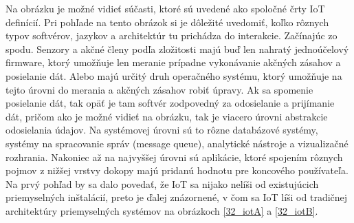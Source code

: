Na obrázku je možné vidieť súčasti, ktoré sú uvedené ako spoločné črty IoT definícií. Pri pohľade na tento obrázok si je dôležité uvedomiť, koľko rôznych typov softvérov, jazykov a architektúr tu prichádza do interakcie. Začínajúc zo spodu. Senzory a akčné členy podľa zložitosti majú buď len nahratý jednoúčelový firmware, ktorý umožňuje len meranie prípadne vykonávanie akčných zásahov a posielanie dát. Alebo majú určitý druh operačného systému, ktorý umožňuje na tejto úrovni do merania a akčných zásahov robiť úpravy. Ak sa spomenie posielanie dát, tak opäť je tam softvér zodpovedný za odosielanie a prijímanie dát, pričom ako je možné vidieť na obrázku, tak je viacero úrovni abstrakcie odosielania údajov. Na systémovej úrovni sú to rôzne databázové systémy, systémy na spracovanie správ (message queue), analytické nástroje a vizualizačné rozhrania. Nakoniec až na najvyššej úrovni sú aplikácie, ktoré spojením rôznych pojmov z nižšej vrstvy dokopy majú pridanú hodnotu pre koncového používateľa. Na prvý pohľad by sa dalo povedať, že IoT sa nijako nelíši od existujúcich priemyselných inštalácií, preto je ďalej znázornené, v čom sa IoT líši od tradičnej architektúry priemyselných systémov na obrázkoch \ref{32_iotA} a \ref{32_iotB}.

